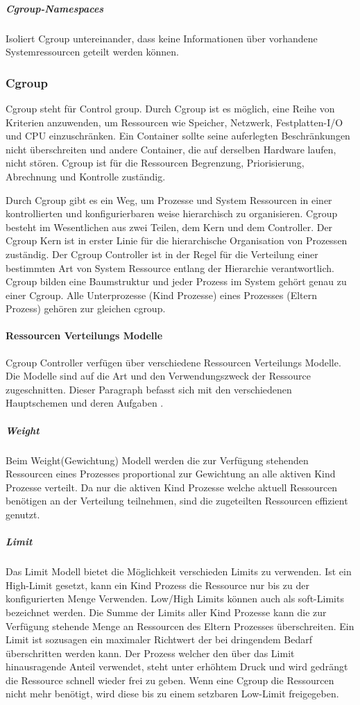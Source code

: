 \subparagraph{Cgroup-Namespaces}
Isoliert Cgroup untereinander, dass keine Informationen über vorhandene Systemressourcen geteilt werden können.



\subsubsection{Cgroup}
\glqq Cgroup\grqq{} steht für \glqq Control group\grqq{}. Durch Cgroup ist es möglich, eine Reihe von Kriterien anzuwenden, um Ressourcen wie Speicher, Netzwerk, Festplatten-I/O und CPU einzuschränken. Ein Container sollte seine auferlegten Beschränkungen nicht überschreiten und andere Container, die auf derselben Hardware laufen, nicht stören. Cgroup ist für die Ressourcen Begrenzung, Priorisierung, Abrechnung und Kontrolle zuständig.

Durch Cgroup gibt es ein Weg, um Prozesse und System Ressourcen in einer kontrollierten und konfigurierbaren weise hierarchisch zu organisieren. Cgroup besteht im Wesentlichen aus zwei Teilen, dem Kern und dem Controller. Der Cgroup Kern ist in erster Linie für die hierarchische Organisation von Prozessen zuständig. Der Cgroup Controller ist in der Regel für die Verteilung einer bestimmten Art von System Ressource entlang der Hierarchie verantwortlich. Cgroup bilden eine Baumstruktur und jeder Prozess im System gehört genau zu einer Cgroup. Alle Unterprozesse (Kind Prozesse) eines Prozesses (Eltern Prozess) gehören zur gleichen cgroup.\cite{Heo2015ControlV2} 


\paragraph{Ressourcen Verteilungs Modelle}
Cgroup Controller verfügen über verschiedene Ressourcen Verteilungs Modelle. Die Modelle sind auf die Art und den Verwendungszweck der Ressource zugeschnitten. Dieser Paragraph befasst sich mit den verschiedenen Hauptschemen und deren Aufgaben \cite{Heo2015ControlV2}.

\subparagraph{Weight}
Beim Weight(Gewichtung) Modell werden die zur Verfügung stehenden Ressourcen eines Prozesses proportional zur Gewichtung an alle aktiven Kind Prozesse verteilt. Da nur die aktiven Kind Prozesse welche aktuell Ressourcen benötigen an der Verteilung teilnehmen, sind die zugeteilten Ressourcen effizient genutzt. 

\subparagraph{Limit}
Das Limit Modell bietet die Möglichkeit verschieden Limits zu verwenden. Ist ein High-Limit gesetzt, kann ein Kind Prozess die Ressource nur bis zu der konfigurierten Menge Verwenden. Low/High Limits können auch als soft-Limits bezeichnet werden. Die Summe der Limits aller Kind Prozesse kann die zur Verfügung stehende Menge an Ressourcen des Eltern Prozesses überschreiten. Ein Limit ist sozusagen ein maximaler Richtwert der bei dringendem Bedarf überschritten werden kann. Der Prozess welcher den über das Limit hinausragende Anteil verwendet, steht unter erhöhtem Druck und wird gedrängt die Ressource schnell wieder frei zu geben. Wenn eine Cgroup die Ressourcen nicht mehr benötigt, wird diese bis zu einem setzbaren Low-Limit freigegeben.


